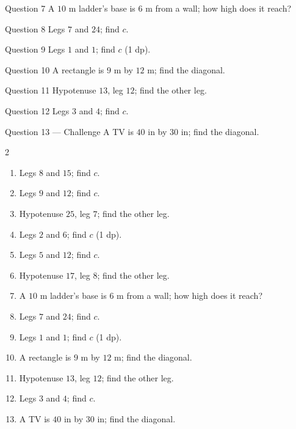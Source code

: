 \documentclass[11pt]{article}
\begin{document}
\begin{qbox}{Question 7}
A $10$ m ladder's base is $6$ m from a wall; how high does it reach?\workspace{2.4cm}
\end{qbox}

\begin{qbox}{Question 8}
Legs $7$ and $24$; find $c$.\workspace{2.0cm}
\end{qbox}

\begin{qbox}{Question 9}
Legs $1$ and $1$; find $c$ (1 dp).\workspace{2.0cm}
\end{qbox}

\begin{qbox}{Question 10}
A rectangle is $9$ m by $12$ m; find the diagonal.\workspace{2.2cm}
\end{qbox}

\begin{qbox}{Question 11}
Hypotenuse $13$, leg $12$; find the other leg.\workspace{2.2cm}
\end{qbox}

\begin{qbox}{Question 12}
Legs $3$ and $4$; find $c$.\workspace{1.8cm}
\end{qbox}

\begin{qbox}{Question 13 --- Challenge}
A TV is $40$ in by $30$ in; find the diagonal.\workspace{2.4cm}
\end{qbox}

\clearpage
{}

\begin{recapbox}
\begin{multicols}{2}
\small
\begin{enumerate}[leftmargin=*,itemsep=3pt]
  \item Legs $8$ and $15$; find $c$.
  \item Legs $9$ and $12$; find $c$.
  \item Hypotenuse $25$, leg $7$; find the other leg.
  \item Legs $2$ and $6$; find $c$ (1 dp).
  \item Legs $5$ and $12$; find $c$.
  \item Hypotenuse $17$, leg $8$; find the other leg.
  \item A $10$ m ladder's base is $6$ m from a wall; how high does it reach?
  \item Legs $7$ and $24$; find $c$.
  \item Legs $1$ and $1$; find $c$ (1 dp).
  \item A rectangle is $9$ m by $12$ m; find the diagonal.
  \item Hypotenuse $13$, leg $12$; find the other leg.
  \item Legs $3$ and $4$; find $c$.
  \item A TV is $40$ in by $30$ in; find the diagonal.
\end{enumerate}
\end{multicols}
\end{recapbox}
\end{document}
